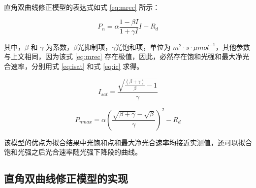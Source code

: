 \documentclass[
]{krantz}
\begin{document}
\citet{YEZiPiao2010} 直角双曲线修正模型的表达式如式 \eqref{eq:mrec} 所示：

\begin{equation}
P_{n} = \alpha \frac{1-\beta I}{1+\gamma I} I - R_{d}
\label{eq:mrec}
\end{equation}

其中，\(\beta\) 和 \(\gamma\) 为系数，\(\beta\)光抑制项，\(\gamma\)光饱和项，单位为
\(m^{2}\cdot s\cdot\mu mol^{-1}\)，其他参数与上文相同，因为该式 \eqref{eq:mrec}
存在极值，因此，必然存在饱和光强和最大净光合速率，分别用式 \eqref{eq:isat} 和式 \eqref{eq:ic} 求得。

\begin{equation}
I_{sat} = \frac{\sqrt{\frac{(\beta+\gamma)}{\beta}-1}}{\gamma}
\label{eq:isat}
\end{equation}

\begin{equation}
P_{nmax} = \alpha\left(\frac{\sqrt{\beta+\gamma}-\sqrt{\beta}}{\gamma}\right)^{2}-R_{d}
\label{eq:ic}
\end{equation}

该模型的优点为拟合结果中光饱和点和最大净光合速率均接近实测值，还可以拟合饱和光强之后光合速率随光强下降段的曲线。

\hypertarget{rev_rec_exam}{%
\subsection{直角双曲线修正模型的实现}\label{rev_rec_exam}}
\end{document}
